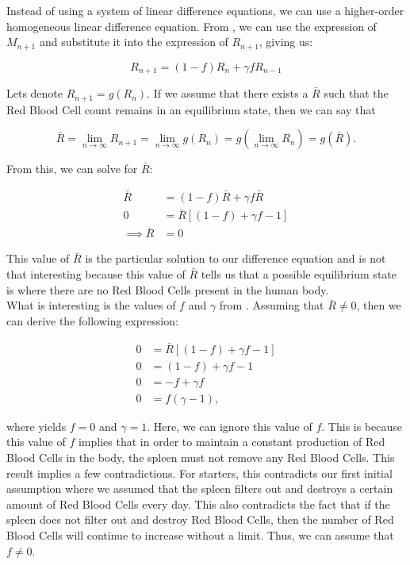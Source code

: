 Instead of using a system of linear difference equations, we can use a higher-order homogeneous linear difference equation. From , we can use the expression of $M_{n+1}$ and substitute it into the expression of $R_{n+1}$, giving us:

\begin{equation}
    R_{n+1} =  (1-f)R_n + \gamma fR_{n-1}
    \label{eq:linear-difference-model-equation}
\end{equation}

Lets denote $R_{n+1} = g(R_n)$.
If we assume that there exists a $\bar{R}$ such that the Red Blood Cell count remains in an equilibrium state, then we can say that

\[
\bar{R} = \lim_{n\to\infty} R_{n+1} = \lim_{n\to\infty} g(R_n) = g\left(\lim_{n\to\infty} R_n\right) = g(\bar{R}).
\]

From this, we can solve for $\bar{R}$:

\begin{align}
    \bar{R} &= (1-f)\bar{R} + \gamma f\bar{R} \nonumber\\
    0 &= \bar{R}[(1-f) + \gamma f - 1] \nonumber \\ 
    \implies \bar{R} &= 0 \label{eq:R-bar-value}
\end{align}

This value of $\bar{R}$ is the particular solution to our difference equation and is not that interesting because this value of $\bar{R}$ tells us that a possible equilibrium state is where there are no Red Blood Cells present in the human body. \\

What is interesting is the values of $f$ and $\gamma$ from . Assuming that $\bar{R} \neq 0$, then we can derive the following expression:

\begin{align} 
    0 &= \bar{R}[(1-f) + \gamma f - 1] \nonumber\\
    0 &= (1-f) + \gamma f - 1 \nonumber\\
    0 &= -f + \gamma f \nonumber\\
    0 &= f(\gamma - 1), \label{eq:parameter-values}
\end{align}

where  yields $f=0$ and $\gamma=1$. Here, we can ignore this value of $f$. This is because this value of $f$ implies that in order to maintain a constant production of Red Blood Cells in the body, the spleen must not remove any Red Blood Cells. This result implies a few contradictions. For starters, this contradicts our first initial assumption where we assumed that the spleen filters out and destroys a certain amount of Red Blood Cells every day. This also contradicts the fact that if the spleen does not filter out and destroy Red Blood Cells, then the number of Red Blood Cells will continue to increase without a limit. Thus, we can assume that $f\neq0$.\\


